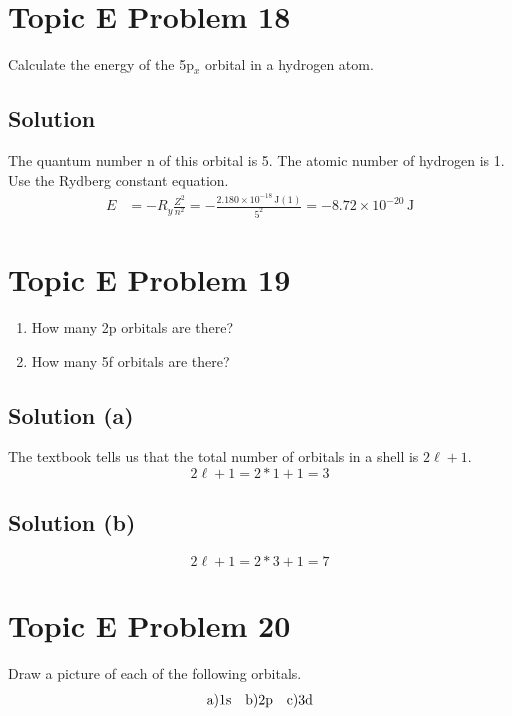 \documentclass[10pt]{article}
\newcommand{\E}[1]{\times 10^{#1}}
\begin{document}
    \pagebreak
    \section{Topic E Problem 18}
        Calculate the energy of the 5p$_{x}$ orbital in a hydrogen atom.

        \subsection{Solution}
            The quantum number n of this orbital is 5. 
            The atomic number of hydrogen is 1.
            Use the Rydberg constant equation.
            \begin{align}
                E   &=  -R_y \frac{Z^2}{n^2}
                    =   -\frac{2.180\E{-18}\,\unit{\joule} (1)}{5^2}
                    =   \boxed{-8.72\E{-20}\,\unit{\joule}}
            \end{align}

    \pagebreak
    \section{Topic E Problem 19}
        \begin{enumerate}[label=\alph*)]
            \item   How many 2p orbitals are there?
            \item   How many 5f orbitals are there?
        \end{enumerate}
        
        \subsection{Solution (a)}
            The textbook tells us that the total number of orbitals in a shell is $2\ell + 1$. 
            \[ 2\ell + 1 = 2 * 1 + 1 = \boxed{3} \]

        \subsection{Solution (b)}
            \[ 2\ell + 1 = 2 * 3 + 1 = \boxed{7} \]

    \pagebreak
    \section{Topic E Problem 20}
        Draw a picture of each of the following orbitals.
        \begin{align*}
            &\rm a) 1s &\rm b) 2p &&\rm c) 3d
        \end{align*}
\end{document}
